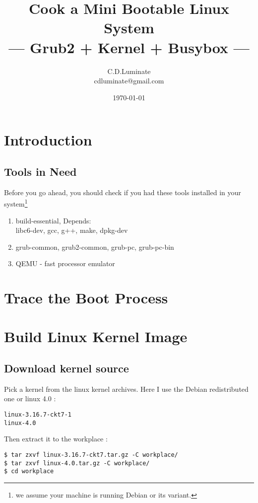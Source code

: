 \documentclass[10pt,a4paper]{article}
\title{\huge\textbf{Cook a Mini Bootable Linux System}\\ \small{--- Grub2 + Kernel + Busybox ---}}
\author{C.D.Luminate\\ \small cdluminate@gmail.com}
\date{\today}
\begin{document}
\pagestyle{fancy}
\maketitle
\hrulefill
\tableofcontents

\newpage
\section{Introduction}
\subsection{Tools in Need}
Before you go ahead, you should check if you had these tools
installed in your system\footnote{we assume your machine is running Debian or its variant.}
\begin{enumerate}
\item build-essential, Depends: \\
	libc6-dev, gcc, g++, make, dpkg-dev
\item grub-common, grub2-common, grub-pc, grub-pc-bin
\item QEMU - fast processor emulator
\end{enumerate}

\section{Trace the Boot Process}


\section{Build Linux Kernel Image}
\subsection{Download kernel source}
Pick a kernel from the linux kernel archives.\cite{bib:kernel.org}\newline
Here I use the Debian redistributed one or linux 4.0 :
\begin{verbatim}
linux-3.16.7-ckt7-1
linux-4.0
\end{verbatim}
Then extract it to the workplace :
\begin{framed}\begin{verbatim}
$ tar zxvf linux-3.16.7-ckt7.tar.gz -C workplace/
$ tar zxvf linux-4.0.tar.gz -C workplace/
$ cd workplace
\end{verbatim}\end{framed}
\end{document}
